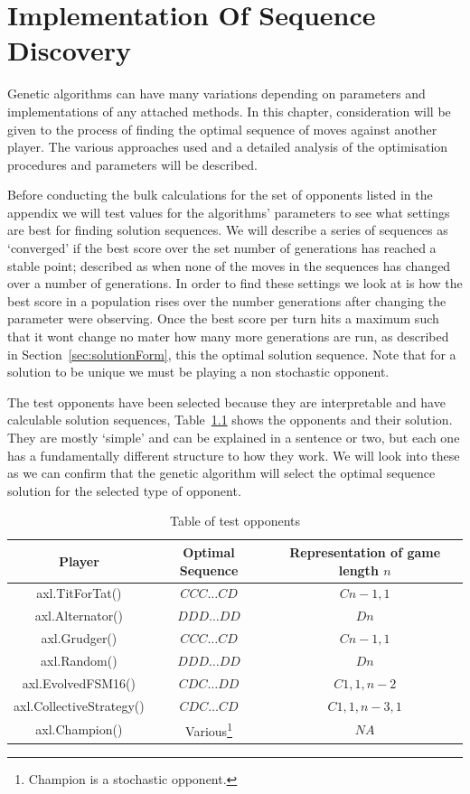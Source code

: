 \chapter{Implementation Of Sequence Discovery}\label{ch:implementation}
Genetic algorithms can have many variations depending on parameters and implementations of any attached methods. In this chapter, consideration will be given to the process of finding the optimal sequence of moves against another player.
The various approaches used and a detailed analysis of the optimisation procedures and parameters will be described.

Before conducting the bulk calculations for the set of opponents listed in the appendix we will test values for the algorithms' parameters to see what settings are best for finding solution sequences.
We will describe a series of sequences as `converged' if the best score over the set number of generations has reached a stable point;
described as when none of the moves in the sequences has changed over a number of generations.
In order to find these settings we look at is how the best score in a population rises over the number generations after changing the parameter were observing.
Once the best score per turn hits a maximum such that it wont change no mater how many more generations are run, as described in Section~\ref{sec:solutionForm}, this the optimal solution sequence.
Note that for a solution to be unique we must be playing a non stochastic opponent.

The test opponents have been selected because they are interpretable and have calculable solution sequences, Table~\ref{table:table_test_opsponents} shows the opponents and their solution.
They are mostly `simple' and can be explained in a sentence or two, but each one has a fundamentally different structure to how they work.
We will look into these as we can confirm that the genetic algorithm will select the optimal sequence solution for the selected type of opponent.

\begin{table}
    \centering
    \begin{tabular}{ccc}
        \toprule
        Player & Optimal Sequence & Representation of game length $n$\\
        \midrule
        axl.TitForTat()&\(CCC\ldots CD\)& $Cn-1,1$\\
        axl.Alternator()&\(DDD\ldots DD\)&$Dn$\\
        axl.Grudger()&\(CCC\ldots CD\)&$Cn-1,1$\\
        axl.Random()&\(DDD\ldots DD\)&$Dn$\\
        axl.EvolvedFSM16()& $CDC\ldots DD$ & $C1,1,n-2$\\
        axl.CollectiveStrategy()&$CDC\ldots CD$&$C1,1,n-3,1$\\
        axl.Champion()& Various\footnote{Champion is a stochastic opponent.} & $NA$\\
        \bottomrule
    \end{tabular}
    \caption{Table of test opponents}\label{table:table_test_opsponents}
\end{table}


